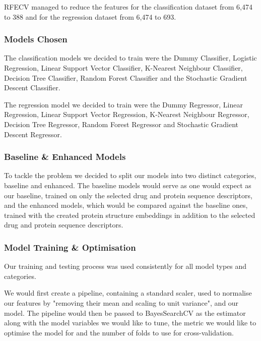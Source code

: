 RFECV managed to reduce the features for the classification dataset from 6,474 to 388 and for the regression dataset from 6,474 to 693.

\subsubsection{Models Chosen}

The classification models we decided to train were the Dummy Classifier, Logistic Regression, Linear Support Vector Classifier,  K-Nearest Neighbour Classifier, Decision Tree Classifier,  Random Forest Classifier and the Stochastic Gradient Descent Classifier.

The regression model we decided to train were the  Dummy Regressor, Linear Regression, Linear Support Vector Regression, K-Nearest Neighbour Regressor,  Decision Tree Regressor, Random Forest Regressor and Stochastic Gradient Descent Regressor.

\subsubsection{Baseline \& Enhanced Models}

To tackle the problem we decided to split our models into two distinct categories, baseline and enhanced. The baseline models would serve as one would expect as our baseline, trained on only the selected drug and protein sequence descriptors, and the enhanced models, which would be compared against the baseline ones, trained with the created protein structure embeddings in addition to the selected drug and protein sequence descriptors. 

\bigskip
\hspace{1cm}

\subsubsection{Model Training \& Optimisation}
\label{subsubsec:Model_Training}

Our training and testing process was used consistently for all model types and categories. 

We would first create a pipeline, containing a standard scaler, used to normalise our features by "removing their mean and scaling to unit variance", and our model. The pipeline would then be passed to BayesSearchCV as the estimator along with the model variables we would like to tune, the metric we would like to optimise the model for and the number of folds to use for cross-validation.

